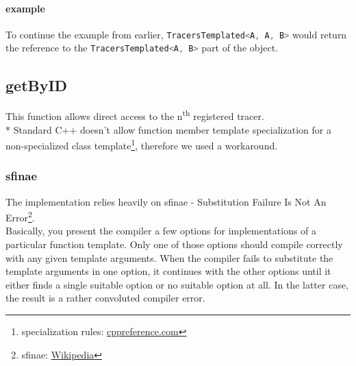 \documentclass[12pt]{article}
\newcommand{\inlinecpp}[1]{\lstinline[language=c++]{#1}}
\begin{document}
\paragraph{example}
To continue the example from earlier, \inlinecpp{TracersTemplated<A, A, B>} would return the reference to the \inlinecpp{TracersTemplated<A, B>} part of the object.

\subsection{getByID}
This function allows direct access to the n\textsuperscript{th} registered tracer.\\*
Standard C++ doesn't allow function member template specialization for a non-specialized class template\footnote{specialization rules: \href{http://en.cppreference.com/w/cpp/language/template_specialization}{cppreference.com}}, therefore we used a workaround.
\subsubsection{sfinae}
The implementation relies heavily on sfinae - Substitution Failure Is Not An Error\footnote{sfinae: \href{http://en.wikipedia.org/wiki/Substitution_failure_is_not_an_error}{Wikipedia}}.\\
Basically, you present the compiler a few options for implementations of a particular function template. Only one of those options should compile correctly with any given template arguments. When the compiler fails to substitute the template arguments in one option, it continues with the other options until it either finds a single suitable option or no suitable option at all. In the latter case, the result is a rather convoluted compiler error.\\
\end{document}
